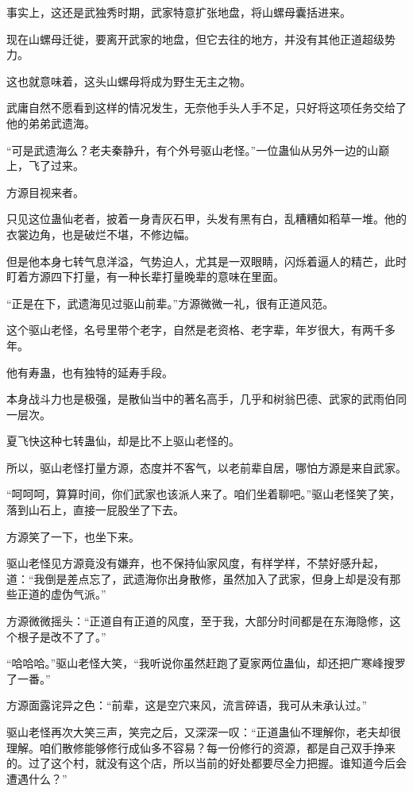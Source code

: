\begin{this_body}
事实上，这还是武独秀时期，武家特意扩张地盘，将山螺母囊括进来。

现在山螺母迁徙，要离开武家的地盘，但它去往的地方，并没有其他正道超级势力。

这也就意味着，这头山螺母将成为野生无主之物。

武庸自然不愿看到这样的情况发生，无奈他手头人手不足，只好将这项任务交给了他的弟弟武遗海。

“可是武遗海么？老夫秦静升，有个外号驱山老怪。”一位蛊仙从另外一边的山巅上，飞了过来。

方源目视来者。

只见这位蛊仙老者，披着一身青灰石甲，头发有黑有白，乱糟糟如稻草一堆。他的衣裳边角，也是破烂不堪，不修边幅。

但是他本身七转气息洋溢，气势迫人，尤其是一双眼睛，闪烁着逼人的精芒，此时盯着方源四下打量，有一种长辈打量晚辈的意味在里面。

“正是在下，武遗海见过驱山前辈。”方源微微一礼，很有正道风范。

这个驱山老怪，名号里带个老字，自然是老资格、老字辈，年岁很大，有两千多年。

他有寿蛊，也有独特的延寿手段。

本身战斗力也是极强，是散仙当中的著名高手，几乎和树翁巴德、武家的武雨伯同一层次。

夏飞快这种七转蛊仙，却是比不上驱山老怪的。

所以，驱山老怪打量方源，态度并不客气，以老前辈自居，哪怕方源是来自武家。

“呵呵呵，算算时间，你们武家也该派人来了。咱们坐着聊吧。”驱山老怪笑了笑，落到山石上，直接一屁股坐了下去。

方源笑了一下，也坐下来。

驱山老怪见方源竟没有嫌弃，也不保持仙家风度，有样学样，不禁好感升起，道：“我倒是差点忘了，武遗海你出身散修，虽然加入了武家，但身上却是没有那些正道的虚伪气派。”

方源微微摇头：“正道自有正道的风度，至于我，大部分时间都是在东海隐修，这个根子是改不了了。”

“哈哈哈。”驱山老怪大笑，“我听说你虽然赶跑了夏家两位蛊仙，却还把广寒峰搜罗了一番。”

方源面露诧异之色：“前辈，这是空穴来风，流言碎语，我可从未承认过。”

驱山老怪再次大笑三声，笑完之后，又深深一叹：“正道蛊仙不理解你，老夫却很理解。咱们散修能够修行成仙多不容易？每一份修行的资源，都是自己双手挣来的。过了这个村，就没有这个店，所以当前的好处都要尽全力把握。谁知道今后会遭遇什么？”


\end{this_body}
